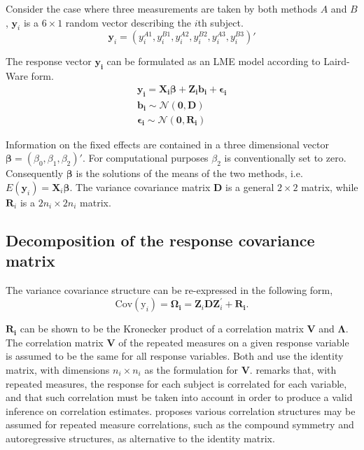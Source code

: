 \documentclass[12pt, a4paper]{report}
\theoremstyle{plain}
\theoremstyle{definition}
\theoremstyle{remark}
\begin{document}
	Consider the case where three measurements are taken by both methods $A$ and $B$, $\boldsymbol{y}_{i}$ is a $6 \times 1$ random vector describing the $i$th subject.
	\[
	\boldsymbol{y}_{i} = (y_{i}^{A1},y_{i}^{B1},y_{i}^{A2},y_{i}^{B2},y_{i}^{A3},y_{i}^{B3}) \prime
	\]
	
	The response vector $\boldsymbol{y_{i}}$ can be formulated as an LME model according to Laird-Ware form.
	\begin{eqnarray*}
		\boldsymbol{y_{i}} = \boldsymbol{X_{i}\beta}  + \boldsymbol{Z_{i}b_{i}} + \boldsymbol{\epsilon_{i}}\\
		\boldsymbol{b_{i}} \sim \mathcal{N}(\boldsymbol{0,D})\\
		\boldsymbol{\epsilon_{i}} \sim \mathcal{N}(\boldsymbol{0,R_{i}})
	\end{eqnarray*}
	
	Information on the fixed effects are contained in a three dimensional vector $\boldsymbol{\beta} = (\beta_{0},\beta_{1},\beta_{2})\prime$. For computational purposes $\beta_{2}$ is conventionally set to zero. Consequently $\boldsymbol{\beta}$ is the solutions of the means of the two methods, i.e. $E(\boldsymbol{y}_{i})  = \boldsymbol{X}_{i}\boldsymbol{\beta}$. The variance covariance matrix $\boldsymbol{D}$ is a general $2 \times 2$ matrix, while $\boldsymbol{R}_{i}$ is a $2n_{i} \times 2n_{i}$ matrix.
	
	\subsection{Decomposition of the response covariance matrix}
	
	The variance covariance structure can be re-expressed in the following form,
	\[
	\mbox{Cov}(\mbox{y}_{i}) = \boldsymbol{\Omega_{i}} = \boldsymbol{Z}_{i}\boldsymbol{D}\boldsymbol{Z}_{i}^\prime + \boldsymbol{R_{i}}.
	\]
	
	$\boldsymbol{R_{i}}$ can be shown to be the Kronecker product of a correlation matrix $\boldsymbol{V}$ and $\boldsymbol{\Lambda}$. The correlation matrix $\boldsymbol{V}$ of the repeated measures on a given response variable is assumed to be the same for all response variables. Both \citet{hamlett} and \citet{lam} use the identity matrix, with dimensions $n_{i} \times n_{i}$ as the formulation for $\boldsymbol{V}$. \citet{ARoy2009} remarks that, with repeated measures, the response for each subject is correlated for each variable, and that such correlation must be taken into account in order to produce a valid inference on correlation estimates.  \citet{ARoy20092006} proposes various correlation structures may be assumed for repeated measure correlations, such as the compound symmetry and autoregressive structures, as alternative to the identity matrix.
	
\end{document}
